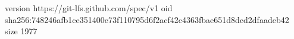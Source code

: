version https://git-lfs.github.com/spec/v1
oid sha256:748246afb1ce351400e73f110795d6f2acf42c4363fbae651d8dcd2dfaadeb42
size 1977
